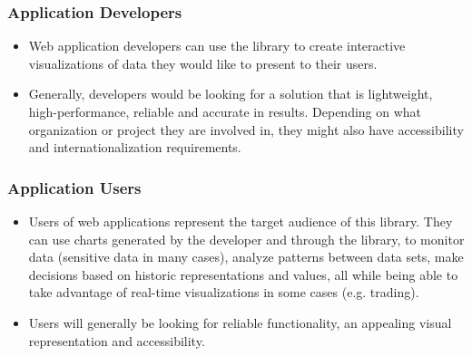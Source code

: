 \documentclass[12pt, titlepage]{article}
\begin{document}
\subsubsection{Application Developers}
\begin{itemize}
    \item Web application developers can use the library to create interactive visualizations of data they would like to present to their users.  
    \item Generally, developers would be looking for a solution that is lightweight, high-performance, reliable and accurate in results. Depending on what organization or project they are involved in, they might also have accessibility and internationalization requirements.
\end{itemize}


\subsubsection{Application Users}
\begin{itemize}
    \item Users of web applications represent the target audience of this library. They can use charts generated by the developer and through the library, to monitor data (sensitive data in many cases), analyze patterns between data sets, make decisions based on historic representations and values, all while being able to take advantage of real-time visualizations in some cases (e.g. trading).
    \item Users will generally be looking for reliable functionality, an appealing visual representation and accessibility.
\end{itemize}
\end{document}
